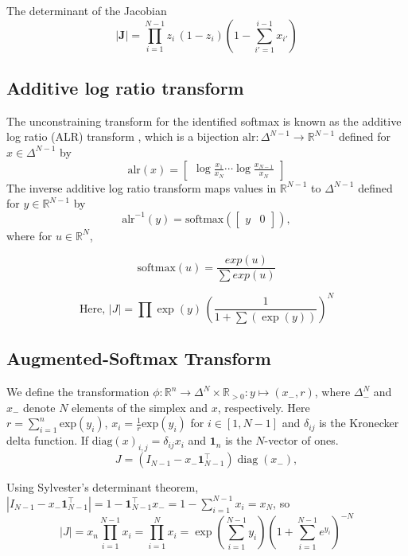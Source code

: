 \documentclass[11pt]{article}
\newcommand{\abs}[1]{\left| #1 \right|}
\begin{document}
The determinant of the Jacobian
\[
   \abs{\mathbf{J}} = \prod_{i=1}^{N-1}z_i\,(1 - z_i)\left(1 - \sum_{i'=1}^{i-1} x_{i'}\right)
\]
\subsection{Additive log ratio transform}
The unconstraining transform for the identified softmax is known as
the additive log ratio (ALR) transform
\cite{aitchison1982statistical}, which is a bijection
$\textrm{alr}:\Delta^{N-1} \rightarrow \mathbb{R}^{N-1}$ defined for
$x \in \Delta^{N-1}$ by
\[
  \textrm{alr}(x)
  = \begin{bmatrix}\displaystyle
    \log \frac{x_1}{x_N} \cdots \log \frac{x_{N-1}}{x_N}
  \end{bmatrix}
\]
The inverse additive log ratio transform maps values in
$\mathbb{R}^{N-1}$ to $\Delta^{N-1}$ defined for $y \in
\mathbb{R}^{N-1}$ by
\[
  \textrm{alr}^{-1}(y)
  = \textrm{softmax}(\begin{bmatrix} y &  0 \end{bmatrix}),
\]
where for $u \in \mathbb{R}^N$,

\[
  \textrm{softmax}(u) = \frac{exp(u)}{\sum exp(u)}
\]

\[
\textrm{Here, } \abs{J} = \prod \exp(y)
  \, \left( \frac{1}{1 + \sum(\exp(y))} \right)^N
\]
\subsection{Augmented-Softmax Transform}
We define the transformation
$\phi: \mathbb{R}^n \to \Delta^{N} \times \mathbb{R}_{>0}: y \mapsto
(x_-, r)$, where  $\Delta_{-}^N$ and $x_{-}$  denote $N$ elements of the simplex and $x$, respectively. Here $r = \sum_{i=1}^n \textrm{exp}(y_i)$,
$x_i = \frac{1}{r} \textrm{exp}(y_i)$ for $i \in [1, N-1]$ and $\delta_{ij}$ is the Kronecker delta function. If $\mathrm{diag}(x)_{i, j} = \delta_{ij} x_i$ and $\boldsymbol{1}_n$ is the $N$-vector of ones.\[
  J = (I_{N-1} - x_- \boldsymbol{1}_{N-1}^\top) \operatorname{diag}(x_-),
\] 

Using Sylvester's determinant theorem,
$|I_{N-1} - x_- \boldsymbol{1}_{N-1}^\top| = 1 -
\boldsymbol{1}_{N-1}^\top x_- = 1 - \sum_{i=1}^{N-1} x_i = x_N$, so
$$ |J| = x_n \prod_{i=1}^{N-1} x_i = \prod_{i=1}^{N} x_i = \exp\left(\sum_{i=1}^{N-1} y_i\right) \left(1 + \sum_{i=1}^{N-1} e^{y_i}\right)^{-N}$$
\end{document}
